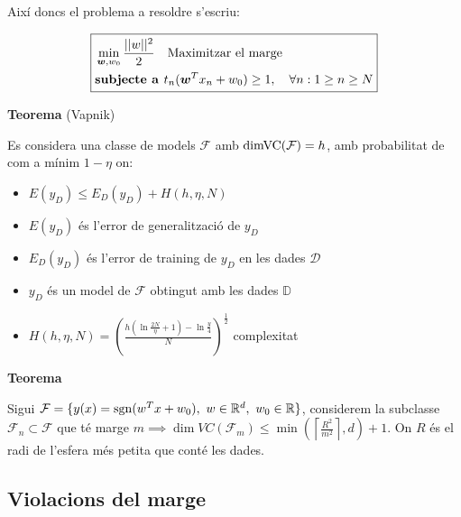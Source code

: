 Així doncs el problema a resoldre s'escriu:

$$
\boxed{
\begin{aligned}
& \min_{\boldsymbol{w},w_0} \frac{||w||^2}{2} \quad \text{Maximitzar el marge} \\
& \text{\textbf{subjecte a }} t_n (\boldsymbol{w}^T x_n + w_0) \ge 1, \quad \forall n : 1 \ge n \ge N
\end{aligned}
}
$$

\textbf{Teorema} (Vapnik)

Es considera una classe de models $\mathcal{F}$ amb $\operatorname{dimVC}(\mathcal{F}) = h$, amb probabilitat de com a mínim $1 - \eta$ on:

\begin{itemize}
	\item $E(y_D) \le E_D (y_D) + H(h, \eta, N)$ 
	\item $E(y_D)$ és l'error de generalització de $y_D$
	\item $E_D(y_D)$ és l'error de training de $y_D$ en les dades $\mathcal{D}$
	\item $y_D$ és un model de $\mathcal{F}$ obtingut amb les dades $\mathbb{D}$
	\item $H(h, \eta, N) = \left( \frac{h(\ln \frac{2N}{\eta} + 1) - \ln \frac{y}{4}}{N} \right)^{\frac{1}{2}}$ complexitat
\end{itemize}

\textbf{Teorema}

Sigui $\mathcal{F} = \{ y(x) = \operatorname{sgn}(w^T x + w_0), \ w \in \mathbb{R}^d, \ w_0 \in \mathbb{R} \}$, considerem la subclasse $\mathcal{F}_n \subset \mathcal{F}$ que té marge $m \implies \dim VC(\mathcal{F}_m) \le \min \left( \left\lceil \frac{R^2}{m^2} \right\rceil, d \right) + 1$. On $R$ és el radi de l'esfera més petita que conté les dades. 

\subsection{Violacions del marge}


